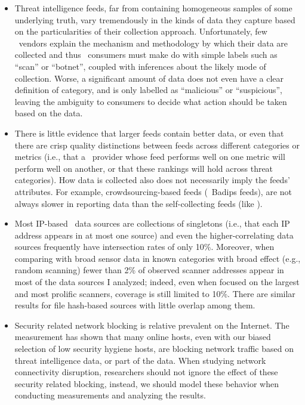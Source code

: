 \begin{itemize}
	\item Threat intelligence feeds, far from containing
    homogeneous samples of some underlying truth, vary tremendously in the
    kinds of data they capture based on the particularities of their
    collection approach. Unfortunately, few \ti\ vendors explain the
    mechanism and methodology by which their data are collected and thus
    \ti\ consumers must make do with simple labels such as
    ``scan'' or ``botnet'', coupled with inferences about the
    likely mode of collection. Worse, a significant amount of data does not
    even have a clear definition of category, and is only labelled as
    ``malicious'' or ``suspicious'', leaving the ambiguity to consumers to
    decide what action should be taken based on the data.

    \item There is little evidence
    that larger feeds contain better data, or even that there are
    crisp quality distinctions between feeds across different categories
    or metrics (i.e., that a \ti\ provider whose feed performs well on one
    metric will perform well on another, or that these rankings will hold
    across threat categories). How data is collected also does not
    necessarily imply the feeds' attributes. For example, crowdsourcing-based feeds (\eg\ Badips feeds), are not always slower in reporting data
    than the self-collecting feeds (like \feedetiprep).

    \item Most IP-based \ti\ data sources are collections of
    singletons (i.e., that each IP address appears in at most one source)
    and even the higher-correlating data sources frequently have
    intersection rates of only 10\%. Moreover, when comparing with broad
    sensor data in known categories with broad effect (e.g., random
    scanning) fewer than 2\% of observed scanner addresses appear in most of
    the data sources I analyzed; indeed, even when focused on the largest
    and most prolific scanners, coverage is still limited to 10\%. There
    are similar results for file hash-based sources with little overlap
    among them.
    
    \item Security related network blocking is relative prevalent on the
    Internet. The measurement has shown that many online hosts, even with 
    our biased selection of low security hygiene hosts, are blocking network 
    traffic based on threat intelligence data, or part of the data. When
    studying network connectivity disruption, researchers should not ignore 
    the effect of these security related blocking, instead, we should model 
    these behavior when conducting measurements and analyzing the results.
    

\end{itemize}
